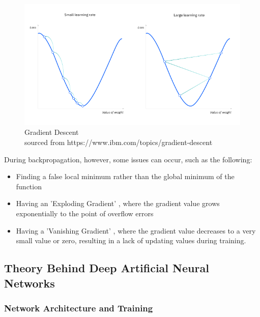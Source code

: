 \documentclass[./project-report/src/latex/project-report.tex]{subfiles}
\begin{document}
\begin{figure}[h!]
\centering
\includegraphics[width=1\textwidth]{./project-report/src/images/gradient-descent.png}
\caption{Gradient Descent\\
         sourced from https://www.ibm.com/topics/gradient-descent \cite{IBMweb}}
\end{figure}

\pagebreak

During backpropagation, however, some issues can occur, such as the following:

\begin{itemize}
    \item Finding a false local minimum rather than the global minimum of the function
    \item Having an 'Exploding Gradient' \cite{hunt2014artificial}, where the gradient value grows exponentially to the point of overflow errors
    \item Having a 'Vanishing Gradient' \cite{hunt2014artificial}, where the gradient value decreases to a very small value or zero, resulting in a lack of updating values 
		  during training.
\end{itemize}

\pagebreak

\subsection{Theory Behind Deep Artificial Neural Networks}
\label{sec:deep-ann-theory}
\vspace{5mm}

\subsubsection{Network Architecture and Training}
\end{document}
